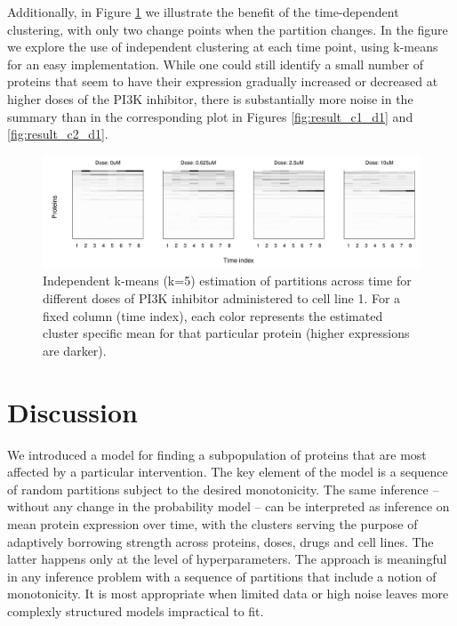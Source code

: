 Additionally, in Figure \ref{fig:eda} we illustrate the benefit of the
time-dependent clustering, with only two change points when the
partition changes.
In the figure we explore the use of independent clustering at each
time point, using k-means for an easy implementation.
While one could still identify a small number of proteins that seem
to have their expression gradually increased or decreased at higher
doses of the PI3K inhibitor, there is substantially more noise in the
summary than in the corresponding plot in Figures
\ref{fig:result_c1_d1} and \ref{fig:result_c2_d1}.


\begin{figure}[tbp]
\centering
\includegraphics[scale=0.55]{figs_supporting_info/SuppInfo_ea_partition_times_11}
\caption{Independent k-means (k=5) estimation of partitions across time for different doses of PI3K inhibitor administered to cell line 1. For a fixed column (time index), each color represents the estimated cluster specific mean for that particular protein (higher expressions are darker).}
\label{fig:eda}
\end{figure}



\section{Discussion}
We introduced a model for finding a subpopulation of proteins that are
most affected by a particular intervention. The key element of the
model is a sequence of random partitions subject to the desired
monotonicity. The same inference -- without any change in the
probability model -- can be interpreted as inference on
mean protein expression over time, with the clusters serving
the purpose of adaptively borrowing strength across proteins, doses,
drugs and cell lines. The latter happens only at the level of
hyperparameters.  The approach is meaningful in any inference problem
with a sequence of partitions that include a notion of
monotonicity. It is most appropriate when limited data or high
noise leaves more complexly structured models impractical to fit.

